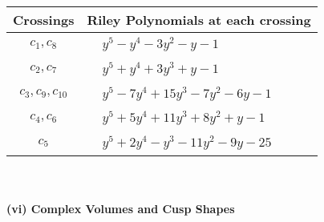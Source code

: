 \documentclass[1p]{elsarticle_modified}
\theoremstyle{definition}
\begin{document}
\begin{tabular}{m{50pt}|m{274pt}}
Crossings & \hspace{64pt}Riley Polynomials at each crossing \\
\hline $$\begin{aligned}c_{1},c_{8}\end{aligned}$$&$\begin{aligned}
&y^5- y^4-3 y^2- y-1
\end{aligned}$\\
\hline $$\begin{aligned}c_{2},c_{7}\end{aligned}$$&$\begin{aligned}
&y^5+y^4+3 y^3+y-1
\end{aligned}$\\
\hline $$\begin{aligned}c_{3},c_{9},c_{10}\end{aligned}$$&$\begin{aligned}
&y^5-7 y^4+15 y^3-7 y^2-6 y-1
\end{aligned}$\\
\hline $$\begin{aligned}c_{4},c_{6}\end{aligned}$$&$\begin{aligned}
&y^5+5 y^4+11 y^3+8 y^2+y-1
\end{aligned}$\\
\hline $$\begin{aligned}c_{5}\end{aligned}$$&$\begin{aligned}
&y^5+2 y^4- y^3-11 y^2-9 y-25
\end{aligned}$\\
\hline
\end{tabular}\\~\\
\newpage\flushleft \textbf{(vi) Complex Volumes and Cusp Shapes}
\end{document}
